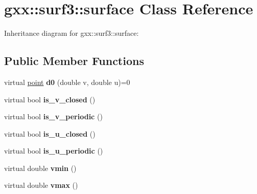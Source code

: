 \hypertarget{classgxx_1_1surf3_1_1surface}{}\section{gxx\+:\+:surf3\+:\+:surface Class Reference}
\label{classgxx_1_1surf3_1_1surface}


Inheritance diagram for gxx\+:\+:surf3\+:\+:surface\+:
\subsection*{Public Member Functions}
\begin{DoxyCompactItemize}
\item 
virtual \hyperlink{classgxx_1_1geom3_1_1point}{point} {\bfseries d0} (double v, double u)=0\hypertarget{classgxx_1_1surf3_1_1surface_a1463b395538aaba62482c3e40d7bbc37}{}\label{classgxx_1_1surf3_1_1surface_a1463b395538aaba62482c3e40d7bbc37}

\item 
virtual bool {\bfseries is\+\_\+v\+\_\+closed} ()\hypertarget{classgxx_1_1surf3_1_1surface_ae695cfef5a0aefcd5b44eb3533c50237}{}\label{classgxx_1_1surf3_1_1surface_ae695cfef5a0aefcd5b44eb3533c50237}

\item 
virtual bool {\bfseries is\+\_\+v\+\_\+periodic} ()\hypertarget{classgxx_1_1surf3_1_1surface_acdc3f4d06bdf9462237e5da48aa4080b}{}\label{classgxx_1_1surf3_1_1surface_acdc3f4d06bdf9462237e5da48aa4080b}

\item 
virtual bool {\bfseries is\+\_\+u\+\_\+closed} ()\hypertarget{classgxx_1_1surf3_1_1surface_ad611c255879b1430f3e77abd51e1f509}{}\label{classgxx_1_1surf3_1_1surface_ad611c255879b1430f3e77abd51e1f509}

\item 
virtual bool {\bfseries is\+\_\+u\+\_\+periodic} ()\hypertarget{classgxx_1_1surf3_1_1surface_a13883ab4029e48e88577a53294999ce1}{}\label{classgxx_1_1surf3_1_1surface_a13883ab4029e48e88577a53294999ce1}

\item 
virtual double {\bfseries vmin} ()\hypertarget{classgxx_1_1surf3_1_1surface_a4b224ad514b0a89df20eb8418f89a761}{}\label{classgxx_1_1surf3_1_1surface_a4b224ad514b0a89df20eb8418f89a761}

\item 
virtual double {\bfseries vmax} ()\hypertarget{classgxx_1_1surf3_1_1surface_a78e79292010f1847b4dbd8d5ca0078c8}{}\label{classgxx_1_1surf3_1_1surface_a78e79292010f1847b4dbd8d5ca0078c8}


\end{DoxyCompactItemize}
